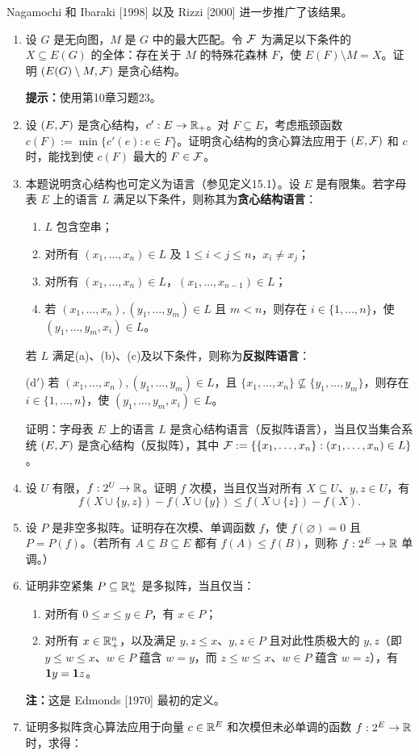 Nagamochi 和 Ibaraki [1998] 以及 Rizzi [2000] 进一步推广了该结果。
\begin{enumerate}[label=\arabic*.]
\item 设 $G$ 是无向图，$M$ 是 $G$ 中的最大匹配。令 $\mathcal F$ 为满足以下条件的 $X\subseteq E(G)$ 的全体：存在关于 $M$ 的特殊花森林 $F$，使 $E(F)\setminus M=X$。证明 $(E(G)\setminus M,\mathcal F)$ 是贪心结构。\par
\textbf{提示：}使用第10章习题23。
\item 设 $(E,\mathcal F)$ 是贪心结构，$c':E\to\mathbb R_+$。对 $F\subseteq E$，考虑瓶颈函数 $c(F):=\min\{c'(e):e\in F\}$。证明贪心结构的贪心算法应用于 $(E,\mathcal F)$ 和 $c$ 时，能找到使 $c(F)$ 最大的 $F\in\mathcal F$。
\item 本题说明贪心结构也可定义为语言（参见定义15.1）。设 $E$ 是有限集。若字母表 $E$ 上的语言 $L$ 满足以下条件，则称其为\textbf{贪心结构语言}：
\begin{enumerate}[label=(\alph*)]
\item $L$ 包含空串；
\item 对所有 $(x_1,\ldots,x_n)\in L$ 及 $1\le i<j\le n$，$x_i\ne x_j$；
\item 对所有 $(x_1,\ldots,x_n)\in L$，$(x_1,\ldots,x_{n-1})\in L$；
\item 若 $(x_1,\ldots,x_n),(y_1,\ldots,y_m)\in L$ 且 $m<n$，则存在 $i\in\{1,\ldots,n\}$，使 $(y_1,\ldots,y_m,x_i)\in L$。
\end{enumerate}
若 $L$ 满足(a)、(b)、(c)及以下条件，则称为\textbf{反拟阵语言}：\par
(d$'$) 若 $(x_1,\ldots,x_n),(y_1,\ldots,y_m)\in L$，且 $\{x_1,\ldots,x_n\}\nsubseteq\{y_1,\ldots,y_m\}$，则存在 $i\in\{1,\ldots,n\}$，使 $(y_1,\ldots,y_m,x_i)\in L$。
\par 证明：字母表 $E$ 上的语言 $L$ 是贪心结构语言（反拟阵语言），当且仅当集合系统 $(E,\mathcal F)$ 是贪心结构（反拟阵），其中 $\mathcal F:=\{\{x_1,\ldots,x_n\}:(x_1,\ldots,x_n)\in L\}$。
\item 设 $U$ 有限，$f:2^U\to\mathbb R$。证明 $f$ 次模，当且仅当对所有 $X\subseteq U$、$y,z\in U$，有
\[f(X\cup\{y,z\})-f(X\cup\{y\})\le f(X\cup\{z\})-f(X).\]
\item 设 $P$ 是非空多拟阵。证明存在次模、单调函数 $f$，使 $f(\varnothing)=0$ 且 $P=P(f)$。（若所有 $A\subseteq B\subseteq E$ 都有 $f(A)\le f(B)$，则称 $f:2^E\to\mathbb R$ 单调。）
\item[$6.^*$] 证明非空紧集 $P\subseteq\mathbb R_+^n$ 是多拟阵，当且仅当：
\begin{enumerate}[label=(\alph*)]
\item 对所有 $0\le x\le y\in P$，有 $x\in P$；
\item 对所有 $x\in\mathbb R_+^n$，以及满足 $y,z\le x$、$y,z\in P$ 且对此性质极大的 $y,z$（即 $y\le w\le x$、$w\in P$ 蕴含 $w=y$，而 $z\le w\le x$、$w\in P$ 蕴含 $w=z$），有 $\mathbf 1 y=\mathbf 1 z$。
\end{enumerate}
\textbf{注：}这是 Edmonds [1970] 最初的定义。
\setcounter{enumi}{6}
\item 证明多拟阵贪心算法应用于向量 $c\in\mathbb R^E$ 和次模但未必单调的函数 $f:2^E\to\mathbb R$ 时，求得：
\end{enumerate}


